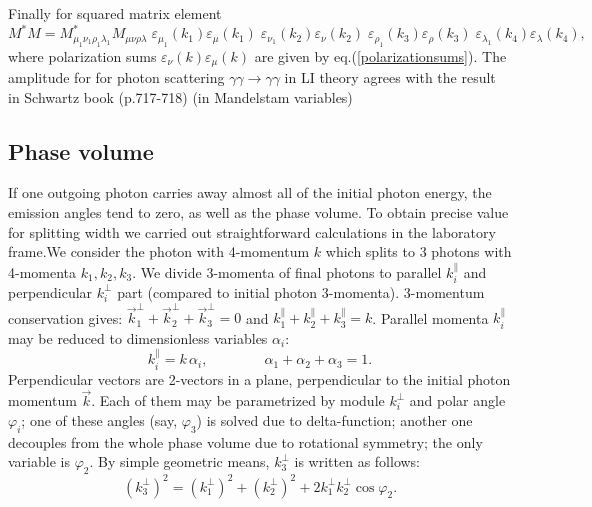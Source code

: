 \documentclass[12pt]{article}
\begin{document}
Finally for squared matrix element
    \begin{equation}
         M^*M =  M^*_{\mu_1\nu_1\rho_1\lambda_1} M_{\mu\nu\rho\lambda}\; \varepsilon_\mu_1(k_1)\varepsilon_\mu(k_1) \;\varepsilon_\nu_1 (k_2) \varepsilon_\nu (k_2)\;\varepsilon_\rho_1(k_3)\varepsilon_\rho(k_3) \; \varepsilon_\lambda_1(k_4)\varepsilon_\lambda(k_4), 
    \label{MatrixElement}    
    \end{equation}
where  polarization sums $\varepsilon_\nu(k)\varepsilon_\mu(k)$ are given by eq.(\ref{polarizationsums}). 
The amplitude for for photon scattering $\gamma\gamma \to \gamma\gamma$ in LI theory agrees with the result in Schwartz book (p.717-718) (in Mandelstam variables)


\subsection{Phase volume}
If one outgoing photon carries away almost all
of the initial photon energy, the emission angles tend to zero, as well as the phase volume.
To obtain precise value for splitting width we carried out straightforward calculations in
the laboratory frame.We consider the photon with 4-momentum $k$ which splits to 3 photons with 4-momenta $k_1, k_2, k_3$. We divide 3-momenta of final photons to parallel $k_i^\parallel$ and perpendicular $k_i^\perp$ part (compared to initial photon 3-momenta). 3-momentum conservation gives: $\vec{k}_1^\perp + \vec{k}_2^\perp +\vec{k}_3^\perp = 0$ and $k_1^\parallel +k_2^\parallel + k_3^\parallel = k$. Parallel momenta $k_i^\parallel$ may be reduced to dimensionless variables $\alpha_i$:
\begin{equation}
k_i^\parallel = k\, \alpha_i, \qquad \qquad \alpha_1 + \alpha_2+\alpha_3=1.
\end{equation}
Perpendicular vectors are 2-vectors in a plane, perpendicular to the initial photon momentum $\vec{k}$. Each of them may be parametrized by module $k_i^\perp$ and polar angle $\varphi_i$; one of these angles (say, $\varphi_3$) is solved due to delta-function; another one decouples from the whole phase volume due to rotational symmetry; the only variable is $\varphi_2$. By simple geometric means, $k_3^\perp$ is written as follows:
\begin{equation}
(k_3^\perp)^2 = (k_1^\perp)^2 + (k_2^\perp)^2 + 2k_1^\perp k_2^\perp \cos \varphi_2.
\end{equation}  
\end{document}
